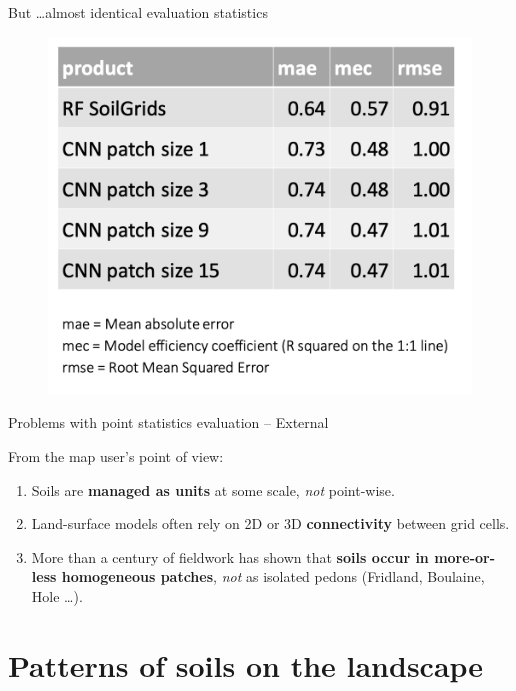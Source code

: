 \documentclass[aspectratio=169]{beamer}
\begin{document}
\begin{frame}{But \ldots almost identical evaluation statistics}
    \begin{figure}
        \centering
\includegraphics[height=0.7\textheight]{./graphics_david/Genova_poster_stats.png}
     \end{figure}
\end{frame}

\begin{frame}{Problems with point statistics evaluation -- External}

From the map user's point of view:
\begin{enumerate}
\item  Soils are \textbf{managed as units} at some scale, \emph{not} point-wise.
\item  Land-surface models often rely on 2D or 3D \textbf{connectivity} between grid cells.
\item  More than a century of fieldwork has shown that \textbf{soils occur in more-or-less homogeneous patches}, \emph{not} as isolated pedons (Fridland, Boulaine, Hole \ldots).
  \end{enumerate}
  
\end{frame}

\section{Patterns of soils on the landscape}
\end{document}
